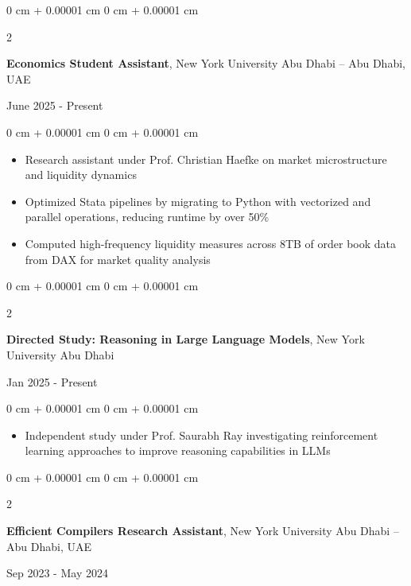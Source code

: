 \documentclass[10 pt,letterpaper]{article}
\newenvironment{highlights}{
    \begin{itemize}[
        topsep=0.10 cm,
        parsep=0.10 cm,
        partopsep=0pt,
        itemsep=0pt,
        leftmargin=0 cm + 10pt
    ]
}{
    \end{itemize}
} %
\newenvironment{onecolentry}{
    \begin{adjustwidth}{
        0 cm + 0.00001 cm
    }{
        0 cm + 0.00001 cm
    }
}{
    \end{adjustwidth}
} %
\newenvironment{twocolentry}[2][]{
    \onecolentry
    \def\secondColumn{#2}
    \setcolumnwidth{\fill, 4.5 cm}
    \begin{paracol}{2}
}{
    \switchcolumn \raggedleft \secondColumn
    \end{paracol}
    \endonecolentry
} %
\begin{document}
        \vspace{0.1 cm}
        \begin{twocolentry}{
            June 2025 - Present
        }
            \textbf{Economics Student Assistant}, New York University Abu Dhabi -- Abu Dhabi, UAE
        \end{twocolentry}

        \vspace{0.1 cm}
        \begin{onecolentry}
            \begin{highlights}
                \item Research assistant under Prof. Christian Haefke on market microstructure and liquidity dynamics
                \item Optimized Stata pipelines by migrating to Python with vectorized and parallel operations, reducing runtime by over 50\% 
                \item Computed high-frequency liquidity measures across 8TB of order book data from DAX for market quality analysis
            \end{highlights}
        \end{onecolentry}

        \vspace{0.10 cm}
        \begin{twocolentry}{
            Jan 2025 - Present
        }
            \textbf{Directed Study: Reasoning in Large Language Models}, 
            New York University Abu Dhabi
        \end{twocolentry}

        \vspace{0.1 cm}
        \begin{onecolentry}
            \begin{highlights}
                \item Independent study under Prof. Saurabh Ray investigating reinforcement learning approaches to improve reasoning capabilities in LLMs

            \end{highlights}
        \end{onecolentry}

        \vspace{0.1 cm}  
        \begin{twocolentry}{
            Sep 2023 - May 2024
        }
            \textbf{Efficient Compilers Research Assistant}, New York University Abu Dhabi -- Abu Dhabi, UAE
        \end{twocolentry}
\end{document}
